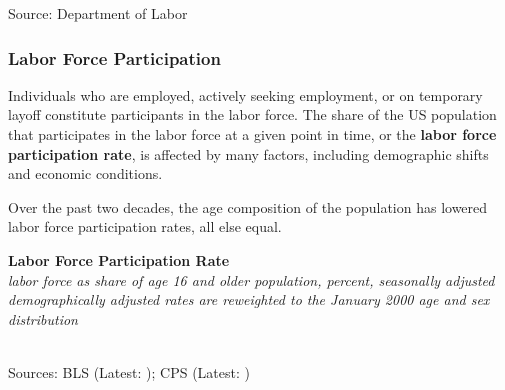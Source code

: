 \documentclass{report}
\makeatletter
\newcommand{\tbllink}[1]{\href{https://raw.githubusercontent.com/bdecon/US-chartbook/master/chartbook/data/#1}{\faTable}}
\newcommand*\short[1]{\expandafter\@gobbletwo\number\numexpr#1\relax}
\newcommand{\absnode}[3]{\node[below right, align=left] at (axis cs: #1,#2) {#3};}
\newcommand{\dateaxisticks}{
		date coordinates in=x, axis line style={draw=none},
		xmax={2024-01-31},
		max space between ticks=40,	    
		xtick={{1990-01-01}, {1992-01-01}, {1994-01-01}, 
			{1996-01-01}, {1998-01-01}, {2000-01-01}, 
			{2002-01-01}, {2004-01-01}, {2006-01-01},
			{2008-01-01}, {2010-01-01}, {2012-01-01}, {2014-01-01},
		    {2016-01-01}, {2018-01-01}, {2020-01-01}, {2022-01-01}, 
		    {2024-01-01}, {2026-01-01}},
		minor xtick={{1989-01-01}, {1991-01-01}, {1993-01-01},
			{1995-01-01}, {1997-01-01}, {1999-01-01}, 
			{2001-01-01}, {2003-01-01}, {2005-01-01}, {2007-01-01},
		    {2009-01-01}, {2011-01-01}, {2013-01-01}, {2015-01-01},
		    {2017-01-01}, {2019-01-01}, {2021-01-01}, {2023-01-01}, 
		    {2025-01-01}, {2027-01-01}},
		enlarge y limits={0.06}, enlarge x limits={0.01},
		xticklabel style={align=center, yshift=-2pt}, tick label style={inner sep=0pt},
		}
\newcommand{\bbar}[2]{extra #1 ticks = {{#2}}, extra #1 tick labels = ,
		extra #1 tick style = {grid=major, grid style={thick, black!25}},}
\newcommand{\stdline}[4]{\addplot[very thick, no markers, color=#1] 
		table [x=#2, y=#3, col sep=comma] {#4};	}
\newcommand{\rbars}{
		\fill[color=black!10] (axis cs:{1990-07-01},\pgfkeysvalueof{/pgfplots/ymin})
			rectangle (axis cs:{1991-03-01}, \pgfkeysvalueof{/pgfplots/ymax});
		\fill[color=black!10] (axis cs:{2007-12-01},\pgfkeysvalueof{/pgfplots/ymin})
			rectangle (axis cs:{2009-07-01}, \pgfkeysvalueof{/pgfplots/ymax});
		\fill[color=black!10] (axis cs:{2001-03-01},\pgfkeysvalueof{/pgfplots/ymin})
			rectangle (axis cs:{2001-11-01}, \pgfkeysvalueof{/pgfplots/ymax});
		\fill[color=black!10] (axis cs:{2020-02-01},\pgfkeysvalueof{/pgfplots/ymin})
			rectangle (axis cs:{2020-05-01}, \pgfkeysvalueof{/pgfplots/ymax});}
\makeatother
\begin{document}
{\begin{minipage}{1.0\textwidth}
\footnotesize{Source: Department of Labor}
\end{minipage}
\newpage
\hypertarget{labp}{\label{labp}}
\begin{minipage}{1.0\textwidth} 
\subsubsection*{Labor Force Participation}
\small Individuals who are employed, actively seeking employment, or on temporary layoff constitute participants in the labor force. The share of the US population that participates in the labor force at a given point in time, or the \textbf{labor force participation rate}, is affected by many factors, including demographic shifts and economic conditions.

Over the past two decades, the age composition of the population has lowered labor force participation rates, all else equal. 


\vspace{2mm}

\normalsize \textbf{Labor Force Participation Rate}\\
\footnotesize{\textit{labor force as share of age 16 and older population, percent, seasonally adjusted\\demographically adjusted rates are reweighted to the January 2000 age and sex distribution}}\\
\hspace*{-1mm} \\
\footnotesize{Sources: BLS (Latest: \unskip); CPS (Latest: \unskip)} \hfill \tbllink{lfpr.csv}
\end{minipage}
\newpage
\begin{minipage}{1.0\textwidth} 

\end{minipage}}
\end{document}
